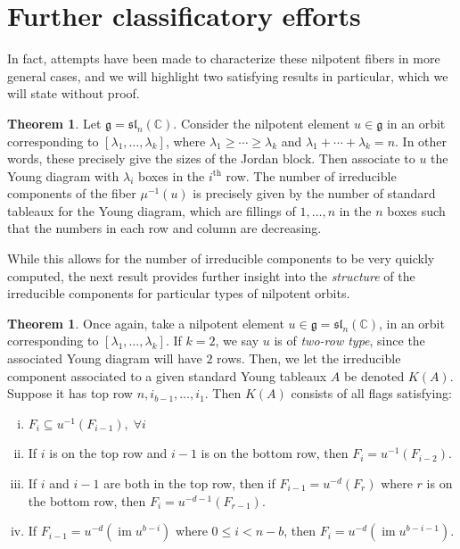 \documentclass[11pt]{article}
\newcommand{\C}{\mathbb{C}}
\newcommand{\image}{\operatorname{im}}
\theoremstyle{definition}
\newtheorem{theorem}[equation]{Theorem}
\numberwithin{equation}{section} %
\begin{document}
\section{Further classificatory efforts}
In fact, attempts have been made to characterize these nilpotent fibers in more general cases, and we will highlight two satisfying results in particular, which we will state without proof.

\begin{theorem}
    \cite{Vargas1979FixedPointsUnipotent} Let $\mathfrak{g} = \mathfrak{sl}_n(\C)$. Consider the nilpotent element $u\in \mathfrak{g}$ in an orbit corresponding to $\left[\lambda_1, \ldots, \lambda_k\right]$, where $\lambda_1\geq \cdots \geq \lambda_k$ and $\lambda_1+\cdots+\lambda_k = n$. In other words, these precisely give the sizes of the Jordan block. Then associate to $u$ the Young diagram with $\lambda_i$ boxes in the $i^\text{th}$ row. The number of irreducible components of the fiber $\mu^{-1}(u)$ is precisely given by the number of standard tableaux for the Young diagram, which are fillings of $1,\ldots, n$ in the $n$ boxes such that the numbers in each row and column are decreasing. 
\end{theorem}

\noindent While this allows for the number of irreducible components to be very quickly computed, the next result provides further insight into the \emph{structure} of the irreducible components for particular types of nilpotent orbits. 

\begin{theorem}
    \cite{Fung2003TopologySpringerFibers} Once again, take a nilpotent element $u \in \mathfrak{g} = \mathfrak{sl}_n(\C)$, in an orbit corresponding to $\left[\lambda_1, \ldots, \lambda_k\right]$. If $k=2$, we say $u$ is of \emph{two-row type}, since the associated Young diagram will have $2$ rows. Then, we let the irreducible component associated to a given standard Young tableaux $A$ be denoted $K(A)$. Suppose it has top row $n, i_{b-1}, \ldots, i_1$. Then $K(A)$ consists of all flags satisfying:
    \begin{enumerate}[(i)]
        \item $F_i\subseteq u^{-1}\left(F_{i-1}\right), \; \forall i$
        
        \item If $i$ is on the top row and $i-1$ is on the bottom row, then $F_i = u^{-1}\left(F_{i-2}\right)$. 

        \item If $i$ and $i-1$ are both in the top row, then if $F_{i-1} = u^{-d}\left(F_r\right)$ where $r$ is on the bottom row, then $F_i = u^{-d-1}\left(F_{r-1}\right)$. 

        \item If $F_{i-1} = u^{-d}\left(\image u^{b-i}\right)$ where $0\leq i<n-b$, then $F_{i} = u^{-d}\left(\image u^{b-i-1}\right)$.
    \end{enumerate}
\end{theorem}
\end{document}
